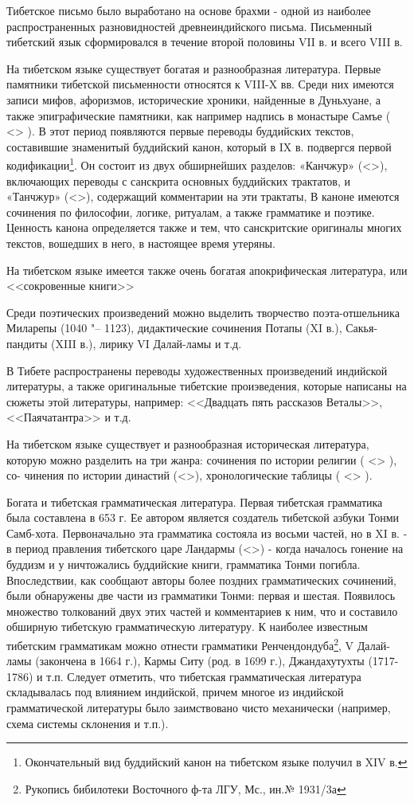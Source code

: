 Тибетское письмо было выработано на основе брахми - одной из наиболее распространенных разновидностей древнеиндийского письма. Письменный тибетский язык сформировался в течение второй половины VII в. и всего VIII в.

На тибетском языке существует богатая и разнообразная литература. Первые памятники тибетской письменности относятся к VIII-X вв. Среди них имеются записи мифов, афоризмов, исторические хроники, найденные в Дуньхуане, а также эпиграфические памятники, как например надпись в монастыре Самъе ( <> ). В этот
период появляются первые переводы буддийских текстов, составившие знаменитый буддийский канон, который в IX в. подвергся первой кодификации\footnote[2]{Окончательный вид буддийский канон на тибетском языке получил в XIV в.}. Он состоит из двух обширнейших разделов: «Канчжур» (<>), включающих переводы с санскрита основных буддийских трактатов, и «Танчжур» (<>), содержащий комментарии на эти трактаты, В каноне имеются сочинения по философии, логике, ритуалам, а также грамматике и поэтике. Ценность канона определяется также и тем, что санскритские оригиналы многих текстов, вошедших в него, в настоящее время утеряны.

На тибетском языке имеется также очень богатая апокрифическая литература, или <<сокровенные книги>>

Среди поэтических произведений можно выделить творчество поэта-отшельника Миларепы (1040 "-- 1123), дидактические сочинения Потапы (XI в.), Сакья-пандиты (XIII в.), лирику VI Далай-ламы и т.д.

В Тибете распространены переводы художественных произведений индийской литературы, а также оригинальные тибетские проиэведения, которые написаны на сюжеты этой литературы, например: <<Двадцать пять рассказов Веталы>>, <<Паячатантра>> и т.д.

На тибетском языке существует и разнообразная историческая литература, которую можно разделить на три жанра: сочинения по истории религии ( <> ), со-
чинения по истории династий (<>), хронологические таблицы ( <> ).

Богата и тибетская грамматическая литература. Первая тибетская грамматика была составлена в 653 г. Ее автором является создатель тибетской азбуки Тонми Самб-хота. Первоначально эта грамматика состояла из восьми частей, но в XI в. - в период правления тибетского царе Ландармы (<>) - когда началось гонение на буддизм и у ничтожались буддийские книги, грамматика Тонми погибла. Впоследствии, как сообщают авторы более поздних грамматических сочинений, были обнаружены две части из грамматики Тонми: первая и шестая. Появилось множество толкований двух этих частей и комментариев к ним, что и составило обширную тибетскую грамматическую литературу. К наиболее известным тибетским грамматикам можно отнести грамматики Ренчендондуба\footnote[3]{Рукопись бибилотеки Восточного ф-та ЛГУ, Мс., ин.№ 1931/3а}, V Далай-ламы (закончена в 1664 г.), Кармы Ситу (род. в 1699 г.), Джандахутухты (1717-1786) и т.п. Следует отметить, что тибетская грамматическая литература складывалась под влиянием индийской, причем многое из индийской грамматической литературы было заимствовано чисто механически (например, схема системы склонения и т.п.).

